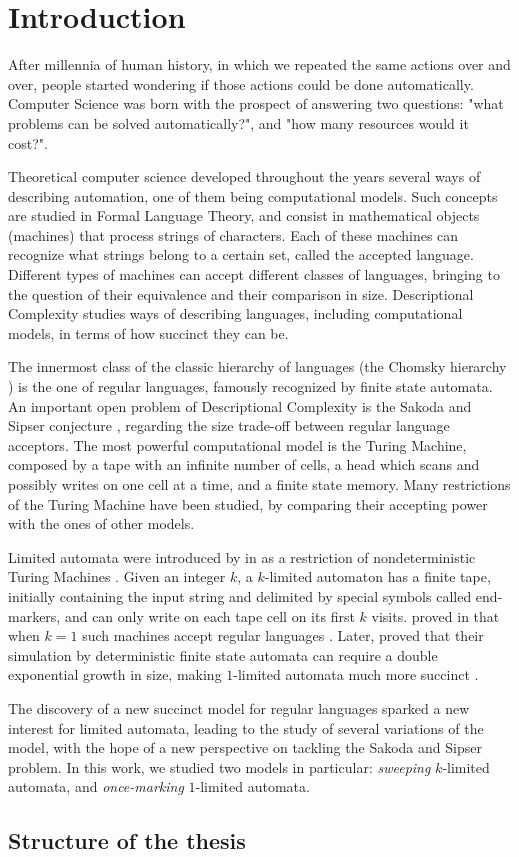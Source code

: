 \chapter{Introduction}
After millennia of human history, in which we repeated the same actions over and over, people started wondering if those actions could be done automatically.
Computer Science was born with the prospect of answering two questions: "what problems can be solved automatically?", and "how many resources would it cost?".

Theoretical computer science developed throughout the years several ways of describing automation, one of them being computational models.
Such concepts are studied in Formal Language Theory, and consist in mathematical objects (machines) that process strings of characters.
Each of these machines can recognize what strings belong to a certain set, called the accepted language.
Different types of machines can accept different classes of languages, bringing to the question of their equivalence and their comparison in size.
Descriptional Complexity studies ways of describing languages, including computational models, in terms of how succinct they can be.

The innermost class of the classic hierarchy of languages (the Chomsky hierarchy \cite{Cho56}) is the one of regular languages, famously recognized by finite state automata.
An important open problem of Descriptional Complexity is the Sakoda and Sipser conjecture \cite{SakSip78}, regarding the size trade-off between regular language acceptors.
The most powerful computational model is the Turing Machine, composed by a tape with an infinite number of cells, a head which scans and possibly writes on one cell at a time, and a finite state memory.
Many restrictions of the Turing Machine have been studied, by comparing their accepting power with the ones of other models.

Limited automata were introduced by \citeauthor{Hib67} in \citeyear{Hib67} as a restriction of nondeterministic Turing Machines \cite{Hib67}.
Given an integer $k$, a $k$-limited automaton has a finite tape, initially containing the input string and delimited by special symbols called end-markers, and can only write on each tape cell on its first $k$ visits.
\citeauthor{WagWec86} proved in \citeyear{WagWec86} that when $k=1$ such machines accept regular languages \cite{WagWec86}.
Later, \citeauthor{PigPis14} proved that their simulation by deterministic finite state automata can require a double exponential growth in size, making $1$-limited automata much more succinct \cite{PigPis14}.

The discovery of a new succinct model for regular languages sparked a new interest for limited automata, leading to the study of several variations of the model, with the hope of a new perspective on tackling the Sakoda and Sipser problem.
In this work, we studied two models in particular: \emph{sweeping} $k$-limited automata, and \emph{once-marking} $1$-limited automata.



\section{Structure of the thesis}
